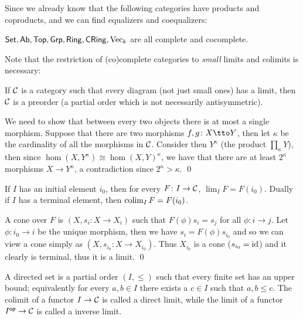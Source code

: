 \eexam

Since we already know that the following categories have products and coproducts, and we can find equalizers and coequalizers:

\bcoro

    ${\sf Set},{\sf Ab},{\sf Top},{\sf Grp},{\sf Ring},{\sf CRing},{\rm Vec}_k$ are all complete and cocomplete.

\ecoro

Note that the restriction of (co)complete categories to {\it small\/} limits and colimits is necessary:

\bprop

    If ${{\cal C}}$ is a category such that every diagram (not just small ones) has a limit, then ${{\cal C}}$ is a preorder (a partial order which is not necessarily antisymmetric).

\eprop

\bproof

    We need to show that between every two objects there is at most a single morphism.
    Suppose that there are two morphisms $f,g\colon X\tto Y$, then let $\kappa$ be the cardinality of all the morphisms in ${{\cal C}}$.
    Consider then $Y^\kappa$ (the product $\prod_\kappa Y$), then since $\hom(X,Y^\kappa)\cong\hom(X,Y)^\kappa$, we have that there are at least $2^\kappa$ morphisms $X\to Y^\kappa$,
    a contradiction since $2^\kappa>\kappa$.
    \qed

\eproof

\bprop

    If $I$ has an initial element $i_0$, then for every $F\colon I\to{{\cal C}}$, $\lim_IF=F(i_0)$.
    Dually if $I$ has a terminal element, then $\mathop{\rm colim}\nolimits_IF=F(i_0)$.

\eprop

\bproof

    A cone over $F$ is $(X,s_i\colon X\to X_i)$ such that $F(\phi)s_i=s_j$ for all $\phi\colon i\to j$.
    Let $\phi\colon i_0\to i$ be the unique morphism, then we have $s_i=F(\phi)s_{i_0}$ and so we can view a cone simply as $(X,s_{i_0}\colon X\to X_{i_0})$.
    Thus $X_{i_0}$ is a cone ($s_{i_0}={\rm id}$) and it clearly is terminal, thus it is a limit.
    \qed

\eproof

\bexam

    A {\emphcolor directed set} is a partial order $(I,\leq)$ such that every finite set has an upper bound; equivalently for every $a,b\in I$ there exists a $c\in I$ such that $a,b\leq c$.
    The colimit of a functor $I\to{{\cal C}}$ is called a {\emphcolor direct limit}, while the limit of a functor $I^{\sf op}\to{{\cal C}}$ is called a {\emphcolor inverse limit}.

